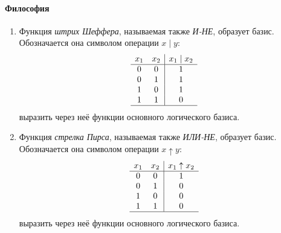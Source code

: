 \paragraph{Философия}
\begin{enumerate}
    \item Функция \emph{штрих Шеффера}, называемая также \emph{И-НЕ}, образует базис. Обозначается она символом операции $x\mid y$:
    \[
        \begin{array}{cc|c}
            x_1&x_2&x_1\mid x_2\\
            \hline
            0&0&1\\
            0&1&1\\
            1&0&1\\
            1&1&0\\
            \hline
        \end{array}
    \]
    выразить через неё функции основного логического базиса.

    \item Функция \emph{стрелка Пирса}, называемая также \emph{ИЛИ-НЕ}, образует базис. Обозначается она символом операции $x\uparrow y$:
    \[
        \begin{array}{cc|c}
            x_1&x_2&x_1\uparrow x_2\\
            \hline
            0&0&1\\
            0&1&0\\
            1&0&0\\
            1&1&0\\
            \hline
        \end{array}
    \]
    выразить через неё функции основного логического базиса.
    
\end{enumerate}

